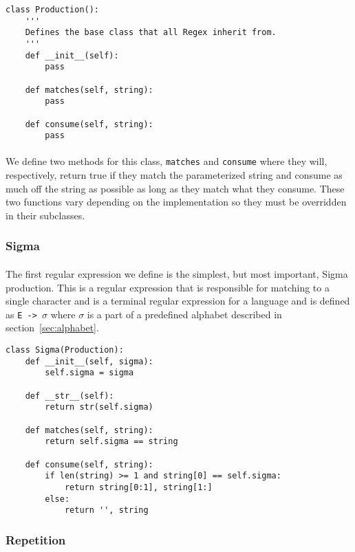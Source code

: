 \documentclass{article}
\begin{document}
\begin{verbatim}
class Production():
    '''
    Defines the base class that all Regex inherit from. 
    '''
    def __init__(self):
        pass

    def matches(self, string):
        pass

    def consume(self, string):
        pass
\end{verbatim}

\paragraph{} We define two methods for this class, \verb|matches| 
and \verb|consume| where they will, respectively, return true if they
match the parameterized string and consume as much off the string as
possible as long as they match what they consume. These two functions
vary depending on the implementation so they must be overridden in
their subclasses.

\subsubsection{Sigma}
\label{sec:algos:regex:sigma}
\paragraph{} The first regular expression we define is the simplest, 
but most important, Sigma production. This is a regular expression
that is responsible for matching to a single character and is a terminal 
regular expression for a language and is defined as \verb|E -> |$\sigma$ where $\sigma$ is a part of a predefined alphabet described in section~\ref{sec:alphabet}. 
\begin{verbatim}
class Sigma(Production):
    def __init__(self, sigma):
        self.sigma = sigma

    def __str__(self):
        return str(self.sigma)

    def matches(self, string):
        return self.sigma == string

    def consume(self, string):
        if len(string) >= 1 and string[0] == self.sigma:
            return string[0:1], string[1:]
        else:
            return '', string
\end{verbatim}

\subsubsection{Repetition}
\label{sec:algos:regex:rep}
\end{document}
